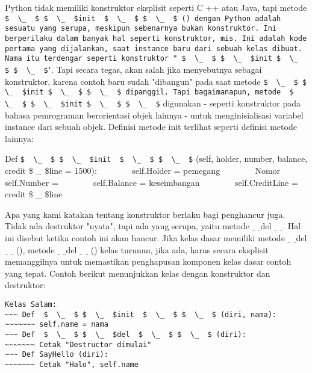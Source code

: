 Python tidak memiliki konstruktor eksplisit seperti C ++ atau Java, tapi metode \verb| $  \_  $ $  \_  $init  $  \_  $ $  \_  $ () dengan Python adalah sesuatu yang serupa, meskipun sebenarnya bukan konstruktor. Ini berperilaku dalam banyak hal seperti konstruktor, mis. Ini adalah kode pertama yang dijalankan, saat instance baru dari sebuah kelas dibuat. Nama itu terdengar seperti konstruktor " $  \_  $ $  \_  $init $  \_  $ $  \_  $|". Tapi secara tegas, akan salah jika menyebutnya sebagai konstruktor, karena contoh baru sudah "dibangun" pada saat metode  \verb|$  \_  $ $  \_  $init $  \_  $ $  \_  $ dipanggil. Tapi bagaimanapun, metode  $  \_  $ $  \_  $init $  \_  $ $  \_  $| digunakan - seperti konstruktor pada bahasa pemrograman berorientasi objek lainnya - untuk menginisialisasi variabel instance dari sebuah objek. Definisi metode init terlihat seperti definisi metode lainnya:

Def  \verb|$  \_  $ $  \_  $init  $  \_  $ $  \_  $| (self, holder, number, balance, credit \$  \_  \$line = 1500): 
~~~~~~~ self.Holder = pemegang
~~~~~~~ Nomor self.Number =
~~~~~~~ self.Balance = keseimbangan
~~~~~~~ self.CreditLine = credit \$  \_  \$line

Apa yang kami katakan tentang konstruktor berlaku bagi penghancur juga. Tidak ada destruktor "nyata", tapi ada yang serupa, yaitu metode  $  \_  $ $  \_  $del $  \_  $ $  \_  $. Hal ini disebut ketika contoh ini akan hancur. Jika kelas dasar memiliki metode  $  \_  $ $  \_  $del  $  \_  $ $  \_  $ (), metode  $  \_  $ $  \_  $del  $  \_  $ $  \_  $ () kelas turunan, jika ada, harus secara eksplisit memanggilnya untuk memastikan penghapusan komponen kelas dasar contoh yang tepat.
Contoh berikut menunjukkan kelas dengan konstruktor dan destruktor:

\begin{verbatim}
Kelas Salam:
~~~ Def  $  \_  $ $  \_  $init  $  \_  $ $  \_  $ (diri, nama):
~~~~~~~ self.name = nama
~~~ Def  $  \_  $ $  \_  $del  $  \_  $ $  \_  $ (diri):
~~~~~~~ Cetak "Destructor dimulai"
~~~ Def SayHello (diri):
~~~~~~~ Cetak "Halo", self.name
\end{verbatim}
